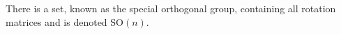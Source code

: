\documentclass[preview]{standalone}
\begin{document}
\begin{center}
There is a set, known as the special orthogonal group, containing all rotation matrices and is denoted $\text{SO}(n)$.
\end{center}
\end{document}

